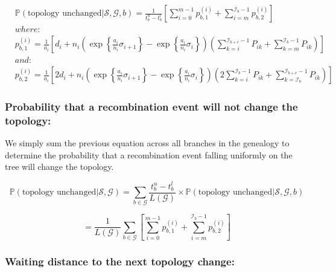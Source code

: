 \documentclass[11pt]{article}
\begin{document}
\begin{equation}
\begin{aligned}
    &\mathbb{P}(\textrm{topology unchanged} | \mathcal{S},\mathcal{G},b) = 
    \frac{1}{t_b^u-t_b^l}\left[\sum_{i=0}^{m-1}p_{b,1}^{(i)}+\sum_{i=m}^{\mathcal{I}_b-1}p_{b,2}^{(i)}\right] \\
    &where: \\
    &p_{b,1}^{(i)} = \frac{1}{a_i}\left[d_i+n_i\left(\exp\left\{\frac{a_i}{n_i}\sigma_{i+1}\right\}-\exp\left\{\frac{a_i}{n_i}\sigma_i\right\}\right)\left(\sum_{k=i}^{\mathcal{I}_{b+c}-1}P_{ik}+\sum_{k=m}^{\mathcal{I}_b-1}P_{ik}\right)\right] \\
    &and: \\
    &p_{b,2}^{(i)} = \frac{1}{a_i}\left[2d_i + n_i\left(\exp\left\{\frac{a_i}{n_i}\sigma_{i+1}\right\}-\exp\left\{\frac{a_i}{n_i}\sigma_{i}\right\}\right)\left(2\sum_{k=i}^{\mathcal{I}_b-1}P_{ik}+\sum_{k=\mathcal{I}_b}^{\mathcal{I}_{b+c}-1}P_{ik}\right)\right]
    \end{aligned}
\end{equation}

\subsubsection{Probability that a recombination event will not change the topology:}

We simply sum the previous equation across all branches in the genealogy to 
determine the probability that a recombination event falling uniformly on the 
tree will change the topology.

\begin{equation*}
    \mathbb{P}(\textrm{topology unchanged} | \mathcal{S},\mathcal{G}) = \sum_{b \in \mathcal{G}}\frac{t_b^u-t_b^l}{L(\mathcal{G})} \times \mathbb{P}(\textrm{topology unchanged} | \mathcal{S},\mathcal{G},b)
\end{equation*}

\begin{equation}
    = \frac{1}{L(\mathcal{G})}\sum_{b \in \mathcal{G}}\left[\sum_{i=0}^{m-1}p_{b,1}^{(i)}+\sum_{i=m}^{\mathcal{I}_b-1}p_{b,2}^{(i)}\right]
\end{equation}

\subsubsection{Waiting distance to the next topology change:}
\end{document}
